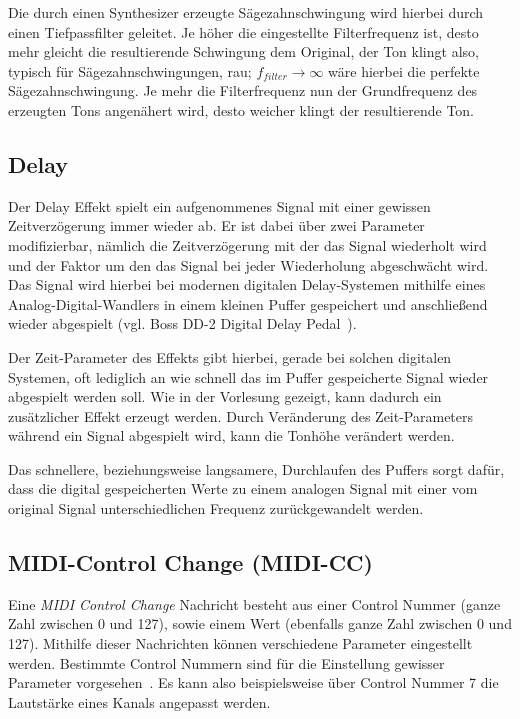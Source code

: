 Die durch einen Synthesizer erzeugte Sägezahnschwingung wird hierbei durch einen Tiefpassfilter geleitet. Je höher die eingestellte Filterfrequenz ist, desto mehr gleicht die resultierende Schwingung dem Original, der Ton klingt also, typisch für Sägezahnschwingungen, rau; $f_{filter} \to \infty$ wäre hierbei die perfekte Sägezahnschwingung. Je mehr die Filterfrequenz nun der Grundfrequenz des erzeugten Tons angenähert wird, desto weicher klingt der resultierende Ton.

\subsection{Delay}
\label{sec:delay}
Der Delay Effekt spielt ein aufgenommenes Signal mit einer gewissen Zeitverzögerung immer wieder ab. Er ist dabei über zwei Parameter modifizierbar, nämlich die Zeitverzögerung mit der das Signal wiederholt wird und der Faktor um den das Signal bei jeder Wiederholung abgeschwächt wird. Das Signal wird hierbei bei modernen digitalen Delay-Systemen mithilfe eines Analog-Digital-Wandlers in einem kleinen Puffer gespeichert und anschließend wieder abgespielt (vgl. Boss DD-2 Digital Delay Pedal~\cite{HobbyHourDD2Delay}).

Der Zeit-Parameter des Effekts gibt hierbei, gerade bei solchen digitalen Systemen, oft lediglich an wie schnell das im Puffer gespeicherte Signal wieder abgespielt werden soll. Wie in der Vorlesung gezeigt, kann dadurch ein zusätzlicher Effekt erzeugt werden. Durch Veränderung des Zeit-Parameters während ein Signal abgespielt wird, kann die Tonhöhe verändert werden.

Das schnellere, beziehungsweise langsamere, Durchlaufen des Puffers sorgt dafür, dass die digital gespeicherten Werte zu einem analogen Signal mit einer vom original Signal unterschiedlichen Frequenz zurückgewandelt werden. 

\subsection{MIDI-Control Change (MIDI-CC)}
\label{sec:MIDI-CC}
Eine \textit{MIDI Control Change} Nachricht besteht aus einer Control Nummer (ganze Zahl zwischen 0 und 127), sowie einem Wert (ebenfalls ganze Zahl zwischen 0 und 127). Mithilfe dieser Nachrichten können verschiedene Parameter eingestellt werden. Bestimmte Control Nummern sind für die Einstellung gewisser Parameter vorgesehen~\cite{moog1986midi}. Es kann also beispielsweise über Control Nummer 7 die Lautstärke eines Kanals angepasst werden.
